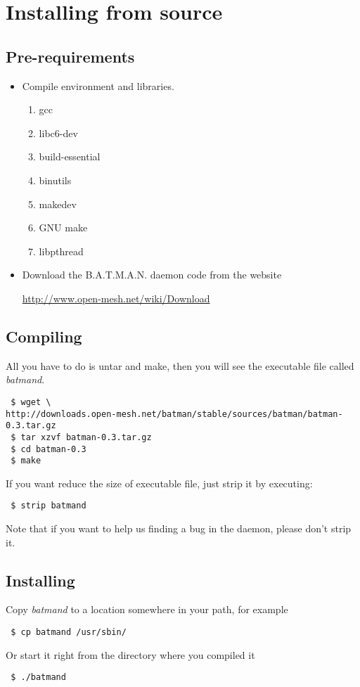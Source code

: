 \section{Installing from source}
\subsection{Pre-requirements}

\begin{itemize}
 \item Compile environment and libraries.
       \begin{enumerate}
        \item gcc
        \item libc6-dev
        \item build-essential
        \item binutils
        \item makedev
        \item GNU make
        \item libpthread
       \end{enumerate}
\item Download the B.A.T.M.A.N. daemon code from the website

     \url{http://www.open-mesh.net/wiki/Download}
\end{itemize}


\subsection{Compiling}
All you have to do is untar and make, then you will see the executable file
called \emph{batmand}.

{\footnotesize
\begin{verbatim}
 $ wget \
http://downloads.open-mesh.net/batman/stable/sources/batman/batman-0.3.tar.gz
 $ tar xzvf batman-0.3.tar.gz
 $ cd batman-0.3
 $ make
\end{verbatim}
}

If you want reduce the size of executable file, just strip it by executing:

\begin{verbatim}
 $ strip batmand
\end{verbatim}

Note that if you want to help us finding a bug in the daemon, please don't strip
it.

\subsection{Installing}
Copy \emph{batmand} to a location somewhere in your path, for example
\begin{verbatim}
 $ cp batmand /usr/sbin/
\end{verbatim}
Or start it right from the directory where you compiled it
\begin{verbatim}
 $ ./batmand
\end{verbatim}
